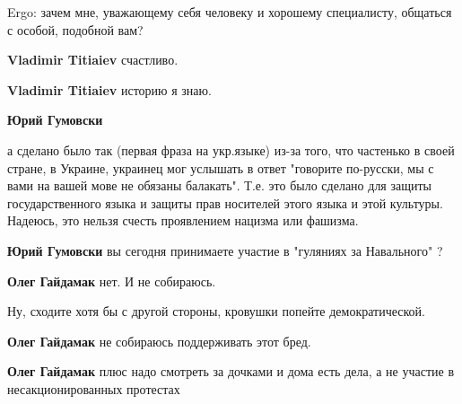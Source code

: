 \begin{itemize}
\begin{itemize}
Ergo: зачем мне, уважающему себя человеку и хорошему специалисту, общаться с
особой, подобной вам?


\textbf{Vladimir Titiaiev} счастливо.


\textbf{Vladimir Titiaiev} историю я знаю.


\textbf{Юрий Гумовски} 

а сделано было так (первая фраза на укр.языке) из-за того, что частенько в
своей стране, в Украине, украинец мог услышать в ответ "говорите по-русски, мы
с вами на вашей мове не обязаны балакать". Т.е. это было сделано для защиты
государственного языка и защиты прав носителей этого языка и этой культуры.
Надеюсь, это нельзя счесть проявлением нацизма или фашизма.



\textbf{Юрий Гумовски} вы сегодня принимаете участие в "гуляниях за Навального" ?


\textbf{Олег Гайдамак} нет. И не собираюсь.


Ну, сходите хотя бы с другой стороны, кровушки попейте демократической.


\textbf{Олег Гайдамак} не собираюсь поддерживать этот бред.


\textbf{Олег Гайдамак} плюс надо смотреть за дочками и дома есть дела, а не участие в несакционированных протестах


\end{itemize}
\end{itemize}
